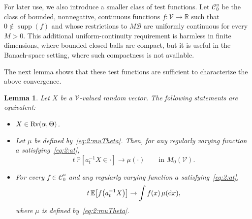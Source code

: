\documentclass[preprint,12pt]{elsarticle}
\newtheorem{lem}[thm]{Lemma}
\theoremstyle{definition}
\theoremstyle{remark}
\newcommand{\xbf}{{ x}}
\newcommand{\Xbf}{{ X}}
\newcommand{\1}{{\mathbf 1}}
\numberwithin{equation}{section}
\newcommand{\Ebb}{\mathbb{E}}  %
\newcommand{\Pbb}{\mathbb{P}}
\newcommand{\ud}{{\rm d}}
\newcommand{\Rvrm}{{\rm Rv}}
\newcommand{\Vcal}{\mathcal{V}}
\newcommand{\Bcal}{\mathcal{B}}
\newcommand{\Ccal}{\mathcal{C}}
\begin{document}
  For later use, we also introduce a smaller class of test functions. 
  Let $\Ccal_0^u$ be the class of bounded, nonnegative, continuous functions $f:\Vcal\to\mathbb{R}$ 
  such that $0\notin\operatorname{supp}(f)$ and whose restrictions to $M\Bcal$ are uniformly continuous for every $M>0$. 
  This additional uniform-continuity requirement is harmless in finite dimensions, 
  where bounded closed balls are compact, but it is useful in the Banach-space setting, where such compactness is not available.

  The next lemma shows that these test functions are sufficient to characterize the above convergence.

  \begin{lem}\label{lem:2:equiv}
    Let $\Xbf$ be a $\Vcal$-valued random vector. The following statements are equivalent:
    \begin{itemize}
      \item[(i)] $\Xbf \in \Rvrm(\alpha,\Theta)$.
	
      \item[(ii)] Let $\mu$ be defined by~\eqref{eq:2:muTheta}. Then, for any regularly varying
		    function $a$ satisfying~\eqref{eq:2:at},
        \begin{equation*}
    		  t\,\Pbb[a_t^{-1}\Xbf \in \cdot] \to \mu(\cdot)
    		  \qquad \text{in } M_0(\Vcal).
        \end{equation*}

		  \item[(iii)] For every $f\in\Ccal_0^u$ and any regularly varying function $a$
		    satisfying~\eqref{eq:2:at},
		    \begin{equation}\label{eq:2:claim}
    		  t\,\Ebb\!\left[f\!\left(a_t^{-1}\Xbf\right)\right]
    		  \to \int f(\xbf)\,\mu(\ud\xbf),
		    \end{equation}
		    where $\mu$ is defined by~\eqref{eq:2:muTheta}.
    \end{itemize}
  \end{lem}
\end{document}

